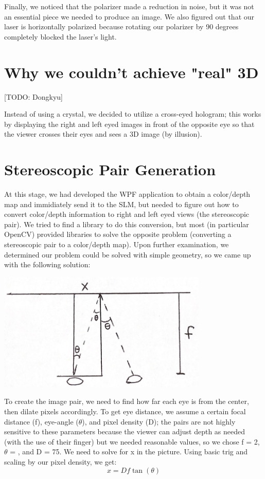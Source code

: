 \documentclass[12pt]{article}
\begin{document}
Finally, we noticed that the polarizer made a reduction in noise, but it was not an essential piece we needed to produce an image. We also figured out that our laser is horizontally polarized because rotating our polarizer by 90 degrees completely blocked the laser's light.

\section{Why we couldn't achieve "real" 3D}

[TODO: Dongkyu]

Instead of using a crystal, we decided to utilize a cross-eyed hologram; this works by displaying the right and left eyed images in front of the opposite eye so that the viewer crosses their eyes and sees a 3D image (by illusion).

\section{Stereoscopic Pair Generation}

At this stage, we had developed the WPF application to obtain a color/depth map and immidiately send it to the SLM, but needed to figure out how to convert color/depth information to right and left eyed views (the stereoscopic pair). We tried to find a library to do this conversion, but most (in particular OpenCV) provided libraries to solve the opposite problem (converting a stereoscopic pair to a color/depth map). Upon further examination, we determined our problem could be solved with simple geometry, so we came up with the following solution:

\begin{center}
\includegraphics[width=100mm]{eye_disp_pic.png}
\end{center}

To create the image pair, we need to find how far each eye is from the center, then dilate pixels accordingly. To get eye distance, we assume a certain focal distance (f), eye-angle (\(\theta\)), and pixel density (D); the pairs are not highly sensitive to these parameters because the viewer can adjust depth as needed (with the use of their finger) but we needed reasonable values, so we chose f = 2, \(\theta\) = , and D = 75. We need to solve for x in the picture. Using basic trig and scaling by our pixel density, we get: \[x = Df\tan(\theta)\]
\end{document}
